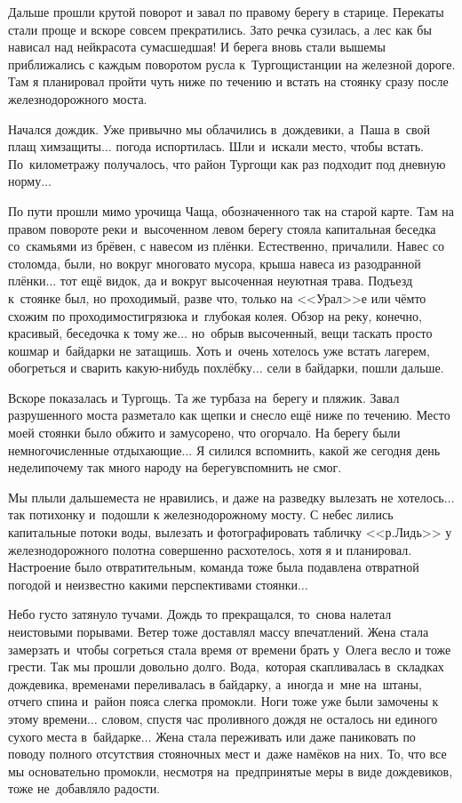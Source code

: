 Дальше прошли крутой поворот и завал по правому берегу в старице. Перекаты стали проще и вскоре совсем прекратились. Зато речка сузилась, а лес как бы нависал над ней\mdash красота сумасшедшая! И берега вновь стали выше\mdash мы приближались с каждым поворотом русла к~Тургощи\mdash станции на железной дороге. Там я планировал пройти чуть ниже по течению и встать на стоянку сразу после железнодорожного моста. 

Начался дождик. Уже привычно мы облачились в~дождевики, а~Паша в~свой плащ химзащиты$\ldots$ погода испортилась. Шли и~искали место, чтобы встать. По~километражу получалось, что район Тургощи как раз подходит под дневную норму$\ldots$

По пути прошли мимо урочища Чаща, обозначенного так на старой карте. Там на правом повороте реки и~высоченном левом берегу стояла капитальная беседка со~скамьями из брёвен, с навесом из плёнки. Естественно, причалили. Навес со столом\mdash да, были, но вокруг многовато мусора, крыша навеса из разодранной плёнки$\ldots$ тот ещё видок, да и вокруг высоченная неуютная трава. Подъезд к~стоянке был, но проходимый, разве что, только на <<Урал>>\sdash е или чём\sdash то схожим по проходимости\mdash грязюка и~глубокая колея. Обзор на реку, конечно, красивый, беседочка к тому же$\ldots$ но~обрыв высоченный, вещи таскать просто кошмар и~байдарки не затащишь. Хоть и~очень хотелось уже встать лагерем, обогреться и сварить какую-нибудь похлёбку$\ldots$ сели в байдарки, пошли дальше.

Вскоре показалась и Тургощь. Та же турбаза на~берегу и пляжик. Завал разрушенного моста разметало как щепки и снесло ещё ниже по течению. Место моей стоянки было обжито и замусорено, что огорчало. На берегу были немногочисленные отдыхающие$\ldots$ Я силился вспомнить, какой же сегодня день недели\mdash почему так много народу на берегу\mdash вспомнить не смог. 

Мы плыли дальше\mdash места не нравились, и даже на разведку вылезать не хотелось$\ldots$ так потихонку и~подошли к железнодорожному мосту. С небес лились капитальные потоки воды, вылезать и фотографировать табличку <<р.\thinspace Лидь>> у железнодорожного полотна совершенно расхотелось, хотя я и планировал. Настроение было отвратительным, команда тоже была подавлена отвратной погодой и неизвестно какими перспективами стоянки$\ldots$

Небо густо затянуло тучами. Дождь то прекращался, то~снова налетал неистовыми порывами. Ветер тоже доставлял массу впечатлений. Жена стала замерзать и~чтобы согреться стала время от времени брать у~Олега весло и тоже грести. Так мы прошли довольно долго. Вода,~которая скапливалась в~складках дождевика, временами переливалась в байдарку, а~иногда и~мне на~штаны, отчего спина и~район пояса слегка промокли. Ноги тоже уже были замочены к этому времени$\ldots$ словом, спустя час проливного дождя не осталось ни единого сухого места в~байдарке$\ldots$ Жена стала переживать или даже паниковать по поводу полного отсутствия стояночных мест и~даже намёков на них. То, что все мы основательно промокли, несмотря на~предпринятые меры в виде дождевиков, тоже не~добавляло радости.

